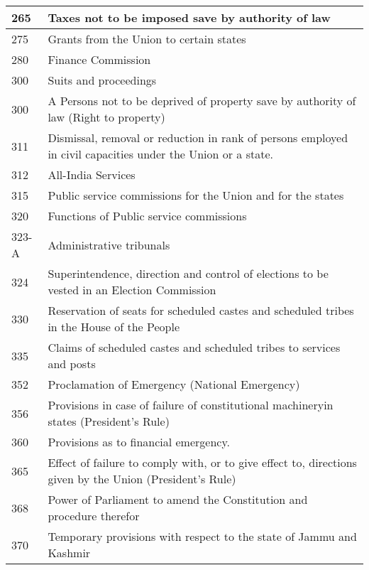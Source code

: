 \begin{multicol}{2}
{\begin{longtable}[c]{@{}|p{2cm}|p{10cm}|@{}}
  265 & Taxes not to be imposed save by authority of law \\ \midrule
  275 & Grants from the Union to certain states \\ \midrule
  280 & Finance Commission \\ \midrule
  300 & Suits and proceedings \\ \midrule
  300 & A Persons not to be deprived of property save by authority of law (Right to property) \\ \midrule
  311 & Dismissal, removal or reduction in rank of persons employed in civil capacities under the Union or a state. \\ \midrule
  312 & All-India Services \\ \midrule
  315 & Public service commissions for the Union and for the states \\ \midrule
  320 & Functions of Public service commissions \\ \midrule
  323-A & Administrative tribunals \\ \midrule
  324 & Superintendence, direction and control of elections to be vested in an Election Commission \\ \midrule
  330 & Reservation of seats for scheduled castes and scheduled tribes in the House of the People \\ \midrule
  335 & Claims of scheduled castes and scheduled tribes to services and posts \\ \midrule
  352 & Proclamation of Emergency (National Emergency) \\ \midrule
  356 & Provisions in case of failure of constitutional machineryin states (President’s Rule) \\ \midrule
  360 & Provisions as to financial emergency. \\ \midrule
  365 & Effect of failure to comply with, or to give effect to, directions given by the Union (President’s Rule) \\ \midrule
  368 & Power of Parliament to amend the Constitution and procedure therefor \\ \midrule
  370 & Temporary provisions with respect to the state of  Jammu and Kashmir\\ \midrule
\end{longtable}
}

\printendnotes

\end{multicol}

\cleardoublepage

%

